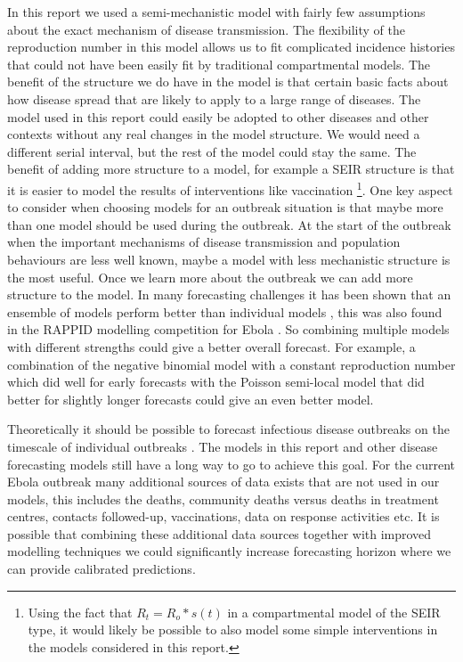 \documentclass[12pt]{article}
\begin{document}
In this report we used a semi-mechanistic model with fairly few assumptions about the exact mechanism of disease transmission. The flexibility of the reproduction number in this model allows us to fit complicated incidence histories that could not have been easily fit by traditional compartmental models. The benefit of the structure we do have in the model is that certain basic facts about how disease spread that are likely to apply to a large range of diseases. The model used in this report could easily be adopted to other diseases and other contexts without any real changes in the model structure. We would need a different serial interval, but the rest of the model could stay the same. The benefit of adding more structure to a model, for example a SEIR structure is that it is easier to model the results of interventions like vaccination \footnote{Using the fact that $R_t=R_o*s(t)$ in a compartmental model of the SEIR type, it would likely be possible to also model some simple interventions in the models considered in this report.}. One key aspect to consider when choosing models for an outbreak situation is that maybe more than one model should be used during the outbreak. At the start of the outbreak when the important mechanisms of disease transmission and population behaviours are less well known, maybe a model with less mechanistic structure is the most useful. Once we learn more about the outbreak we can add more structure to the model. In many forecasting challenges it has been shown that an ensemble of models perform better than individual models \cite{dietterichEnsembleMethodsMachine2000}, this was also found in the RAPPID modelling competition for Ebola \cite{viboudRAPIDDEbolaForecasting2018}. So combining multiple models with different strengths could give a better overall forecast. For example, a combination of the negative binomial model with a constant reproduction number which did well for early forecasts with the Poisson semi-local model that did better for slightly longer forecasts could give an even better model.

Theoretically it should be possible to forecast infectious disease outbreaks on the timescale of individual outbreaks \cite{scarpinoPredictabilityInfectiousDisease2019}. The models in this report and other disease forecasting models still have a long way to go to achieve this goal. For the current Ebola outbreak many additional sources of data exists that are not used in our models, this includes the deaths, community deaths versus deaths in treatment centres, contacts followed-up, vaccinations, data on response activities etc. It is possible that combining these additional data sources together with improved modelling techniques we could significantly increase forecasting horizon where we can provide calibrated predictions. 
\end{document}
